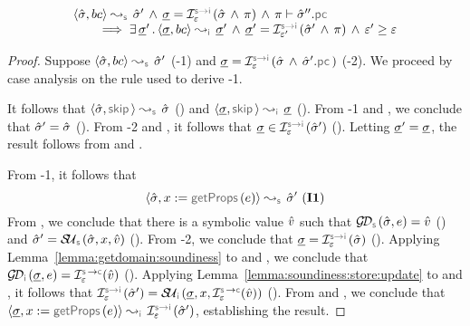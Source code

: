 \begin{lemma}\label{lemma:soundiness:basic:commands}
$$
\begin{array}{l}
\absbsemrule{\sstate, \bcmd}{\sstate'}{\symbolic} 
    \, \wedge \, \istate = \interpret{\symbinst}{\senv}(\sstate \, \wedge \, \pc)
    \, \wedge \, \pc \vdash \sstate''.\pcsel \\ \quad \quad
     \implies 
        \exists \, \istate' \, . \, \absbsemrule{\istate, \bcmd}{\istate'}{\instrumented} \, \wedge \, 
            \istate' = \interpret{\symbinst}{\senv'}(\sstate' \, \wedge \, \pc)  \, \wedge \, 
            \senv' \fextends  \senv
\end{array}
$$
\end{lemma}
\begin{proof}
Suppose $\absbsemrule{\sstate, \bcmd}{\sstate'}{\symbolic}$ (\hyp{1}) and 
$\istate = \interpret{\symbinst}{\senv}(\sstate \, \wedge \, \sstate'.\pcsel)$ (\hyp{2}).
We proceed by case analysis on the rule used to derive \hyp{1}. 
\vspace{3pt}

\noindent {} It follows that $\absbsemrule{\sstate, \jsilskip}{\sstate}{\symbolic}$ () and 
$\absbsemrule{\istate, \jsilskip}{\istate}{\instrumented}$ (). 
From \hyp{1} and , we conclude that $\hat{\sigma}' = \hat{\sigma}$ (). 
From \hyp{2} and , it follows that $\istate \in \interpret{\symbinst}{\senv}(\sstate')$ (). 
Letting $\underline{\sigma}' = \underline{\sigma}$, the result follows from  and . 
\vspace{5pt}

\noindent {} From \hyp{1}, it follows that 
$$
\absbsemrule{\sstate, \jvar := \getfields(\jsilexpr)}{\sstate'}{\symbolic} \text{ (\ieq{1})}
$$ 
From , we conclude that there is a symbolic value $\hat{v}$ such that 
$\absgetdomainfun{\symbolic}(\sstate, \jsilexpr) = \sexprv$ () 
and $\sstate' = \stupdt{\symbolic}(\sstate, \jvar, \sexprv)$ ().  
From \hyp{2}, we conclude that $\istate = \interpret{\symbinst}{\senv}(\sstate)$ (). 
Applying Lemma~\ref{lemma:getdomain:soundiness} to  and , we conclude that 
$\absgetdomainfun{\instrumented}(\istate, \jsilexpr) = \interpret{\symbconc}{\senv}(\sexprv)$ (). 
Applying Lemma~\ref{lemma:soundiness:store:update} to  and , it follows that 
$ \interpret{\symbinst}{\senv}(\sstate') = \stupdt{\instrumented}(\istate, \jvar, \interpret{\symbconc}{\senv}(\sexprv))$ (). 
From  and , we conclude that $\absbsemrule{\istate, \jvar := \getfields(\jsilexpr)}{\interpret{\symbinst}{\senv}(\sstate')}{\instrumented}$, establishing the result. 
\vspace{5pt}


\end{proof}
